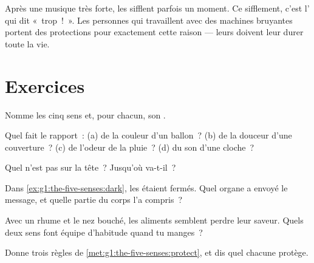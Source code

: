 \begin{example}\label{ex:g1:the-five-senses:loud}
Après une musique très forte, les  sifflent parfois un
moment. Ce sifflement, c'est l' qui dit «~trop~!~». Les
personnes qui travaillent avec des machines bruyantes portent des
protections pour exactement cette raison --- leurs  doivent
leur durer toute la vie.
\end{example}

\section{Exercices}

\begin{exercise}[$\star$]\label{exo:g1:the-five-senses:1}
Nomme les cinq sens et, pour chacun, son .
\end{exercise}

\begin{exercise}[$\star$]\label{exo:g1:the-five-senses:2}
Quel  fait le rapport~: (a) de la couleur d'un
ballon~? (b) de la douceur d'une couverture~? (c) de l'odeur de la
pluie~? (d) du son d'une cloche~?
\end{exercise}

\begin{exercise}[$\star$]\label{exo:g1:the-five-senses:3}
Quel  n'est pas sur la tête~? Jusqu'où va-t-il~?
\end{exercise}

\begin{exercise}[$\star$]\label{exo:g1:the-five-senses:4}
Dans \cref{ex:g1:the-five-senses:dark}, les  étaient fermés.
Quel organe a envoyé le message, et quelle partie du corps l'a
compris~?
\end{exercise}

\begin{exercise}[$\star$]\label{exo:g1:the-five-senses:5}
Avec un rhume et le nez bouché, les aliments semblent perdre leur
saveur. Quels deux sens font équipe d'habitude quand tu manges~?
\end{exercise}

\begin{exercise}[$\star$]\label{exo:g1:the-five-senses:6}
Donne trois règles de \cref{met:g1:the-five-senses:protect}, et dis
quel  chacune protège.
\end{exercise}

